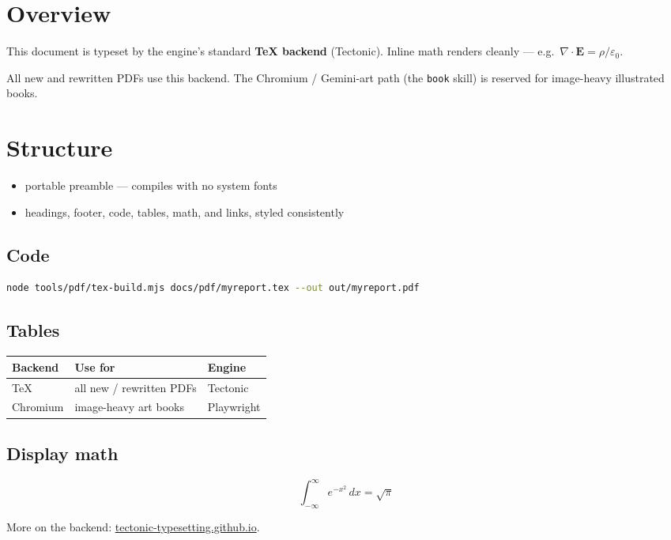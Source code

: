 \documentclass[11pt]{article}
\title{\color{accent}\doctitle}
\author{Engine · TeX backend}
\date{\today}
\newcommand{\callout}[1]{%
  \par\medskip\noindent
  \colorbox{soft}{\parbox{\dimexpr\linewidth-2\fboxsep\relax}{\color{ink}#1}}%
  \par\medskip}
\begin{document}
\maketitle
\thispagestyle{fancy}

\section{Overview}
This document is typeset by the engine's standard \textbf{TeX backend}
(Tectonic). Inline math renders cleanly --- e.g.\ $\nabla\cdot\mathbf{E}=\rho/\varepsilon_0$.

\callout{All new and rewritten PDFs use this backend. The Chromium / Gemini-art
path (the \texttt{book} skill) is reserved for image-heavy illustrated books.}

\section{Structure}
\begin{itemize}[noitemsep]
  \item portable preamble --- compiles with no system fonts
  \item headings, footer, code, tables, math, and links, styled consistently
\end{itemize}

\subsection{Code}
\begin{lstlisting}[language=bash]
node tools/pdf/tex-build.mjs docs/pdf/myreport.tex --out out/myreport.pdf
\end{lstlisting}

\subsection{Tables}
\begin{center}
\begin{tabular}{@{}lll@{}}
\toprule
Backend & Use for & Engine \\
\midrule
TeX & all new / rewritten PDFs & Tectonic \\
Chromium & image-heavy art books & Playwright \\
\bottomrule
\end{tabular}
\end{center}

\subsection{Display math}
\[ \int_{-\infty}^{\infty} e^{-x^2}\,dx = \sqrt{\pi} \]

More on the backend: \href{https://tectonic-typesetting.github.io}{tectonic-typesetting.github.io}.
\end{document}
